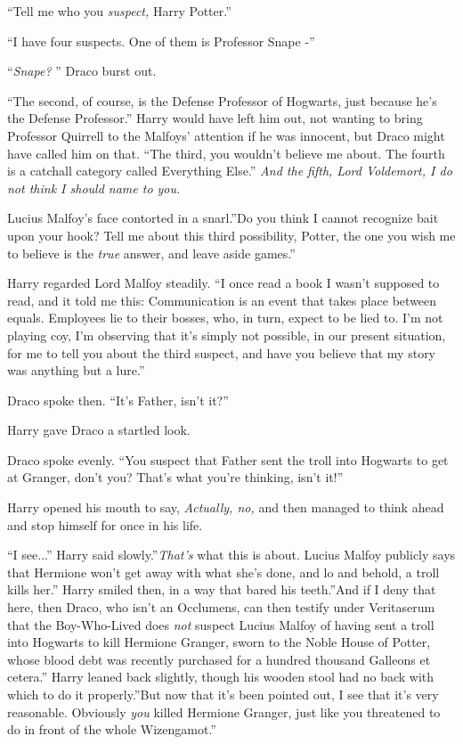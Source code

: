 ``Tell me who you \emph{suspect,} Harry Potter.''

``I have four suspects. One of them is Professor Snape -''

``\emph{Snape?} '' Draco burst out.

``The second, of course, is the Defense Professor of Hogwarts, just
because he's the Defense Professor.'' Harry would have left him out, not
wanting to bring Professor Quirrell to the Malfoys' attention if he was
innocent, but Draco might have called him on that. ``The third, you
wouldn't believe me about. The fourth is a catchall category called
Everything Else.'' \emph{And the fifth, Lord Voldemort, I do not think I
should name to you.}

Lucius Malfoy's face contorted in a snarl.''Do you think I cannot
recognize bait upon your hook? Tell me about this third possibility,
Potter, the one you wish me to believe is the \emph{true} answer, and
leave aside games.''

Harry regarded Lord Malfoy steadily. ``I once read a book I wasn't
supposed to read, and it told me this: Communication is an event that
takes place between equals. Employees lie to their bosses, who, in turn,
expect to be lied to. I'm not playing coy, I'm observing that it's
simply not possible, in our present situation, for me to tell you about
the third suspect, and have you believe that my story was anything but a
lure.''

Draco spoke then. ``It's Father, isn't it?''

Harry gave Draco a startled look.

Draco spoke evenly. ``You suspect that Father sent the troll into
Hogwarts to get at Granger, don't you? That's what you're thinking,
isn't it!''

Harry opened his mouth to say, \emph{Actually, no,} and then managed to
think ahead and stop himself for once in his life.

``I see...'' Harry said slowly.''\emph{That's} what this is about.
Lucius Malfoy publicly says that Hermione won't get away with what she's
done, and lo and behold, a troll kills her.'' Harry smiled then, in a
way that bared his teeth.''And if I deny that here, then Draco, who
isn't an Occlumens, can then testify under Veritaserum that the
Boy-Who-Lived does \emph{not} suspect Lucius Malfoy of having sent a
troll into Hogwarts to kill Hermione Granger, sworn to the Noble House
of Potter, whose blood debt was recently purchased for a hundred
thousand Galleons et cetera.'' Harry leaned back slightly, though his
wooden stool had no back with which to do it properly.''But now that
it's been pointed out, I see that it's very reasonable. Obviously
\emph{you} killed Hermione Granger, just like you threatened to do in
front of the whole Wizengamot.''

